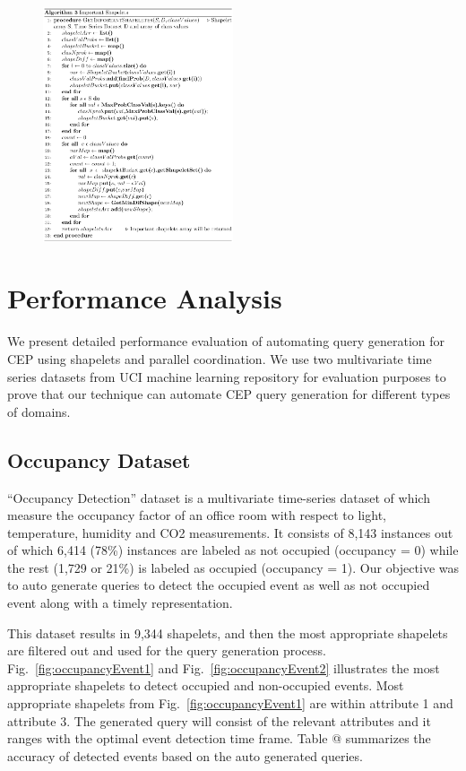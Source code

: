 \documentclass[conference]{IEEEtran}  %
\makeatletter
\newcommand*{\rom}[1]{\expandafter\@slowromancap\romannumeral #1@}
\makeatother
\begin{document}
\begin{figure}
\includegraphics[width=0.5\textwidth]{algo3.png}\squeezeup\squeezeup
\end{figure}

\section{Performance Analysis}
We present detailed performance evaluation of automating query generation for CEP using shapelets and parallel coordination. We use two multivariate time series datasets from UCI machine learning repository \cite{IEEEexample:Ocupancy,IEEEexample:EEG} for evaluation purposes to prove that our technique can automate CEP query generation for different types of domains.

\subsection{Occupancy Dataset} 
“Occupancy Detection” dataset \cite{IEEEexample:Ocupancy} is a multivariate time-series dataset of which measure the occupancy factor of an office room with respect to light, temperature, humidity and CO2 measurements. It consists of 8,143 instances out of which 6,414 (78\%) instances are labeled as not occupied (occupancy = 0) while the rest (1,729 or 21\%) is labeled as occupied (occupancy = 1). Our objective was to auto generate queries to detect the occupied event as well as not occupied event along with a timely representation.

This dataset results in 9,344 shapelets, and then the most appropriate shapelets are filtered out and used for the query generation process. Fig.~\ref{fig:occupancyEvent1} and Fig.~\ref{fig:occupancyEvent2} illustrates the most appropriate shapelets to detect occupied and non-occupied events. Most appropriate shapelets from Fig.~\ref{fig:occupancyEvent1} are within attribute 1 and attribute 3. The generated query will consist of the relevant attributes and it ranges with the optimal event detection time frame. Table \rom{1} summarizes the accuracy of detected events based on the auto generated queries.  
\end{document}

